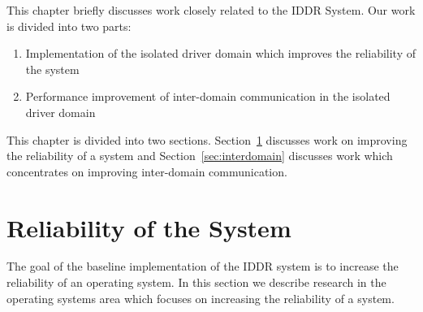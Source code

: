 This chapter briefly discusses work closely related to the IDDR System. Our work is divided into two parts: 
\begin{enumerate}
\item Implementation of the isolated driver domain which improves the reliability of the system 
\item Performance improvement of inter-domain communication in the isolated driver domain 
\end{enumerate}
This chapter is divided into two sections. Section~\ref{sec:robustness} discusses work on improving the reliability of a system and Section~\ref{sec:interdomain} discusses work which concentrates on improving inter-domain communication.
\\[3mm]

\section{Reliability of the System}
\label{sec:robustness}
The goal of the baseline implementation of the IDDR system is to increase the reliability of an operating system. In this section we describe research in the operating systems area which focuses on increasing the reliability of a system.

